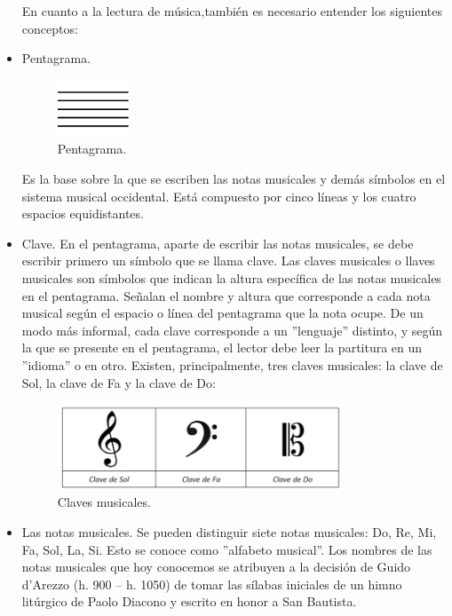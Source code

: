 \documentclass[a4paper, openright, 11pt, titlepage]{report}
\theoremstyle{definition}\newtheorem{defin}[propo]{Definition}
\theoremstyle{definition}\newtheorem{obser}[propo]{Remark}
\theoremstyle{definition}\newtheorem{ejem}[propo]{Ejemplo}
\theoremstyle{definition}\newtheorem{algoritmo}[propo]{Algoritmo}
\begin{document}
\begin{itemize}
    En cuanto a la lectura de música,también es necesario entender los siguientes conceptos:
    \item Pentagrama. 
   \begin{figure}[H]
        \begin{center}
            \includegraphics[width=0.2\textwidth]{Images/Apéndices/Apéndice A/penta.png}
        \end{center}
        \caption{Pentagrama.}
    \end{figure}
    Es la base sobre la que se escriben las notas musicales y demás símbolos en el sistema musical occidental. Está compuesto por cinco líneas y los cuatro espacios equidistantes.
    \item Clave. En el pentagrama, aparte de escribir las notas musicales, se debe escribir primero un símbolo que se llama clave.
    Las claves musicales o llaves musicales son símbolos que indican la altura específica de las notas musicales en el pentagrama. Señalan el nombre y altura que corresponde a cada nota musical según el espacio o línea del pentagrama que la nota ocupe. De un modo más informal, cada clave corresponde a un ''lenguaje'' distinto, y según la que se presente en el pentagrama, el lector debe leer la partitura en un ''idioma'' o en otro. Existen, principalmente, tres claves musicales: la clave de Sol, la clave de Fa y la clave de Do:
    \begin{figure}[H]
        \centering
        \includegraphics[width = 0.8\textwidth]{Images/Apéndices/Apéndice A/claves.png}
        \caption{Claves musicales.}
    \end{figure}
    \item Las notas musicales. Se pueden distinguir siete notas musicales: Do, Re, Mi, Fa, Sol, La, Si. Esto se conoce como ''alfabeto musical''. Los nombres de las notas musicales que hoy conocemos se atribuyen a la decisión de Guido d’Arezzo (h. 900 – h. 1050) de tomar las sílabas iniciales de un himno litúrgico de Paolo Diacono y escrito en honor a San Bautista. \cite{alfabeto}

\end{itemize}
\end{document}

